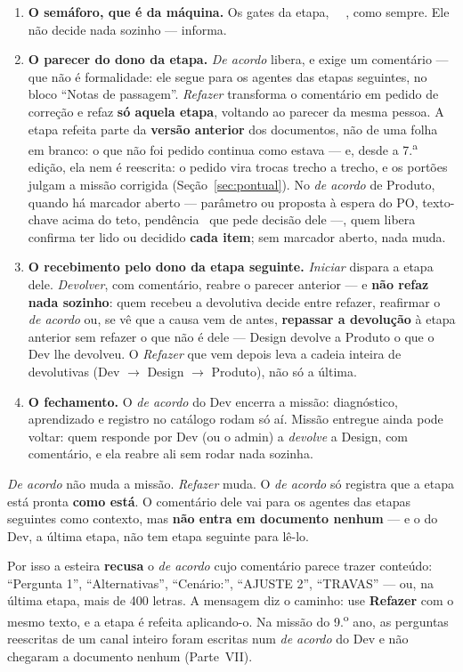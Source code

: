 \documentclass[11pt,a4paper]{article}
\newcommand{\cod}[1]{{\ttfamily\small #1}}
\newcommand{\bolinha}[1]{\tikz[baseline=-0.5ex]{\fill[#1] (0,0) circle (0.33em);}}
\newcommand{\statusVerde}{\bolinha{sinalVerde}}
\newcommand{\statusAmbar}{\bolinha{sinalAmbar}}
\newcommand{\statusVermelho}{\bolinha{sinalVermelho}}
\begin{document}
\begin{enumerate}
  \item \textbf{O semáforo, que é da máquina.} Os gates da etapa, \statusVerde\ \statusAmbar\ \statusVermelho, como sempre. Ele não decide nada sozinho --- informa.
  \item \textbf{O parecer do dono da etapa.} \emph{De acordo} libera, e exige um comentário --- que não é formalidade: ele segue para os agentes das etapas seguintes, no bloco ``Notas de passagem''. \emph{Refazer} transforma o comentário em pedido de correção e refaz \textbf{só aquela etapa}, voltando ao parecer da mesma pessoa. A etapa refeita parte da \textbf{versão anterior} dos documentos, não de uma folha em branco: o que não foi pedido continua como estava --- e, desde a 7.\textsuperscript{a} edição, ela nem é reescrita: o pedido vira trocas trecho a trecho, e os portões julgam a missão corrigida (Seção~\ref{sec:pontual}). No \emph{de acordo} de Produto, quando há marcador aberto --- parâmetro ou proposta à espera do PO, texto-chave acima do teto, pendência \statusAmbar\ que pede decisão dele ---, quem libera confirma ter lido ou decidido \textbf{cada item}; sem marcador aberto, nada muda.
  \item \textbf{O recebimento pelo dono da etapa seguinte.} \emph{Iniciar} dispara a etapa dele. \emph{Devolver}, com comentário, reabre o parecer anterior --- e \textbf{não refaz nada sozinho}: quem recebeu a devolutiva decide entre refazer, reafirmar o \emph{de acordo} ou, se vê que a causa vem de antes, \textbf{repassar a devolução} à etapa anterior sem refazer o que não é dele --- Design devolve a Produto o que o Dev lhe devolveu. O \emph{Refazer} que vem depois leva a cadeia inteira de devolutivas (Dev $\rightarrow$ Design $\rightarrow$ Produto), não só a última.
  \item \textbf{O fechamento.} O \emph{de acordo} do Dev encerra a missão: diagnóstico, aprendizado e registro no catálogo rodam só aí. Missão entregue ainda pode voltar: quem responde por Dev (ou o \cod{admin}) a \emph{devolve} a Design, com comentário, e ela reabre ali sem rodar nada sozinha.
\end{enumerate}

\begin{caixaGuardrail}{\emph{De acordo} não muda a missão. \emph{Refazer} muda.}
O \emph{de acordo} só registra que a etapa está pronta \textbf{como está}. O comentário dele vai para os agentes das etapas seguintes como contexto, mas \textbf{não entra em documento nenhum} --- e o do Dev, a última etapa, não tem etapa seguinte para lê-lo.

Por isso a esteira \textbf{recusa} o \emph{de acordo} cujo comentário parece trazer conteúdo: ``Pergunta 1'', ``Alternativas'', ``Cenário:'', ``AJUSTE 2'', ``TRAVAS'' --- ou, na última etapa, mais de 400 letras. A mensagem diz o caminho: use \textbf{Refazer} com o mesmo texto, e a etapa é refeita aplicando-o. Na missão do 9.\textsuperscript{o} ano, as perguntas reescritas de um canal inteiro foram escritas num \emph{de acordo} do Dev e não chegaram a documento nenhum (Parte~VII).
\end{caixaGuardrail}
\end{document}
